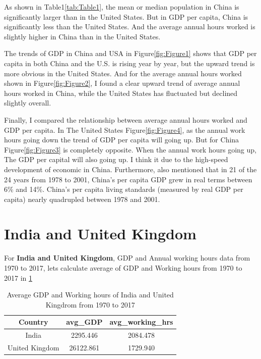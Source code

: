 \documentclass[11pt,a4paper,]{article}
\begin{document}
As shown in Table1\ref{tab:Table1}, the mean or median population in China is significantly larger than in the United States. But in GDP per capita, China is significantly less than the United States. And the average annual hours worked is slightly higher in China than in the United States.

The trends of GDP in China and USA in Figure\ref{fig:Figure1} shows that GDP per capita in both China and the U.S. is rising year by year, but the upward trend is more obvious in the United States. And for the average annual hours worked shown in Figure\ref{fig:Figure2}, I found a clear upward trend of average annual hours worked in China, while the United States has fluctuated but declined slightly overall.

Finally, I compared the relationship between average annual hours worked and GDP per capita. In The United States Figure\ref{fig:Figure4}, as the annual work hours going down the trend of GDP per capita will going up. But for China Figure\ref{fig:Figure3} is completely opposite. When the annual work hours going up, The GDP per capital will also going up. I think it due to the high-speed development of economic in China. Furthermore, \textcite{BANISTER200521} also mentioned that in 21 of the 24 years from 1978 to 2001, China's per capita GDP grew in real terms between 6\% and 14\%. China's per capita living standards (measured by real GDP per capita) nearly quadrupled between 1978 and 2001.

\clearpage

\hypertarget{india-and-united-kingdom}{%
\section{India and United Kingdom}\label{india-and-united-kingdom}}

For \textbf{India and United Kingdom}, GDP and Annual working hours data from 1970 to 2017, lets calculate average of GDP and Working hours from 1970 to 2017 in \ref{tab:TableAvg}

\begin{table}[!h]

\caption{\label{tab:TableAvg}Average GDP and Working hours of India and United Kingdrom from 1970 to 2017}
\centering
\begin{tabular}[t]{c|c|c}
\hline
Country & avg\_GDP & avg\_working\_hrs\\
\hline
India & 2295.446 & 2084.478\\
\hline
United Kingdom & 26122.861 & 1729.940\\
\hline
\end{tabular}
\end{table}
\end{document}
